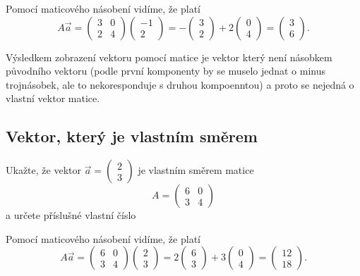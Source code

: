\reseni
Pomocí maticového násobení vidíme, že platí
$$ A\vec a=
\begin{pmatrix}
  3& 0 \\ 2 &4
\end{pmatrix}
\begin{pmatrix}
  -1\\2
\end{pmatrix}
=-
\begin{pmatrix}
  3\\2
\end{pmatrix}
+2
\begin{pmatrix}
  0\\4
\end{pmatrix}
=
\begin{pmatrix}
  3\\6
\end{pmatrix}.
$$

Výsledkem zobrazení vektoru pomocí matice je vektor který není násobkem původního vektoru (podle první komponenty by se muselo jednat o minus trojnásobek, ale to nekoresponduje s druhou kompoenntou) a proto se nejedná o vlastní vektor matice.

\konec


\subsection{Vektor, který je vlastním směrem}

Ukažte, že vektor $\vec a=
  \begin{pmatrix}
    2\\3
  \end{pmatrix}
  $
  je vlastním směrem matice $$A=\begin{pmatrix}  6& 0 \\ 3 &4\end{pmatrix}$$
  a určete příslušné vlastní číslo

\reseni
Pomocí maticového násobení vidíme, že platí
$$A\vec a=
\begin{pmatrix}
  6& 0 \\ 3 &4
\end{pmatrix}
\begin{pmatrix}
  2\\3
\end{pmatrix}
=2
\begin{pmatrix}
  6\\3
\end{pmatrix}
+3
\begin{pmatrix}
  0\\4
\end{pmatrix}
=
\begin{pmatrix}
  12\\18
\end{pmatrix}.
$$


